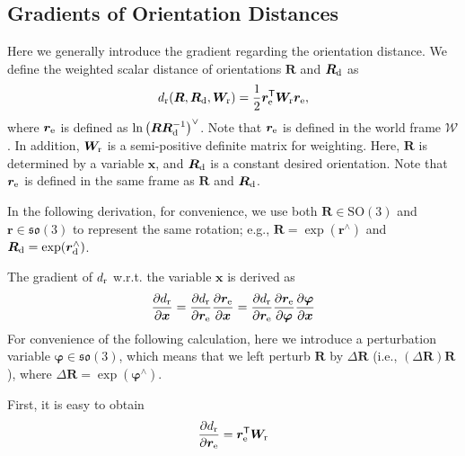 {\subsection{Gradients of Orientation Distances}

Here we generally introduce the gradient regarding the orientation distance. 
We define the weighted scalar distance of orientations $\bm R$ and $\bm R_{\rm d}$ as 
\begin{equation}
d_{\rm r}(\bm R, \bm R_{\rm d}, \bm W_{\rm r}) = \frac{1}{2} \bm r_{\rm e}^{\mathsf{T}} \bm W_{\rm r} \bm r_{\rm e} ,
\end{equation}
where 
$\bm r_{\rm e}$ is defined as $\ln \left( \bm R \bm R_{\rm d}^{-1} \right)^{\vee}$. Note that $\bm r_{\rm e}$ is defined in the world frame $\mathcal{W}$. In addition, $\bm W_{\rm r}$ is a semi-positive definite matrix for weighting. 
Here, $\bm R$ is determined by a variable $\bm x$, and $\bm R_{\rm d}$ is a constant desired orientation.
Note that $\bm r_{\rm e}$ is defined in the same frame as $\bm R$ and $\bm R_{\rm d}$. 

In the following derivation, for convenience, we use both $\bm R \in \text{SO}(3)$ and $\bm r \in \mathfrak{so}(3)$ to represent the same rotation; e.g., $\bm R = \exp (\bm r^{\wedge})$ and $\bm R_{\rm d} = \exp (\bm r_{\rm d}^{\wedge})$.

The gradient of $d_{\rm r}$ w.r.t. the variable $\bm x$ is derived as
\begin{equation} \label{eq:partial_dr_partial_x}
\begin{aligned}
\frac{\partial d_{\rm r}}{\partial \bm x} = 
\frac{\partial d_{\rm r}}{\partial \bm r_{\rm e}} 
\frac{\partial \bm r_{\rm e}}{\partial\bm x} 
= \frac{\partial d_{\rm r}}{\partial \bm r_{\rm e}} 
\frac{\partial \bm r_{\rm e}}{\partial \bm \varphi} 
\frac{\partial \bm \varphi}{\partial \bm x} 
\end{aligned}
\end{equation}
For convenience of the following calculation, here we introduce a perturbation variable $\bm \varphi \in \mathfrak{so}(3)$, which means that we left perturb $\bm R$ by $\Delta \bm R$ (i.e., $(\Delta \bm R)\bm R$ ), where $\Delta \bm R = \exp(\bm \varphi^{\wedge})$. 


First, it is easy to obtain
\begin{equation}
    \frac{\partial d_{\rm r}}{\partial \bm r_{\rm e}} 
    =  \bm r_{\rm e}^{\mathsf{T}} \bm W_{\rm r}
\end{equation}

}
